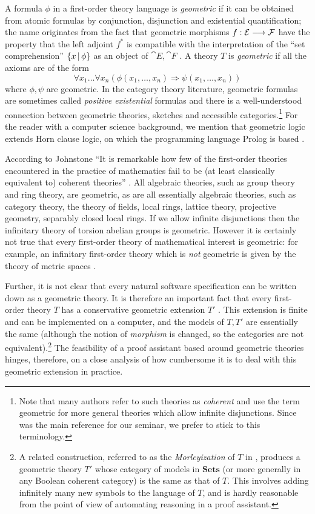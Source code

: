 \documentclass[english,letter paper,12pt,reqno]{article}
\theoremstyle{example}
\begin{document}
A formula $\phi$ in a first-order theory language is \emph{geometric} if it can be obtained from atomic formulas by conjunction, disjunction and existential quantification; the name originates from the fact that geometric morphisms $f: \mathcal{E} \longrightarrow \mathcal{F}$ have the property that the left adjoint $f^*$ is compatible with the interpretation of the ``set comprehension'' $\{ x \,|\, \phi \}$ as an object of $\cat{E}, \cat{F}$ \cite[Theorem X.5]{topos}. A theory $T$ is \emph{geometric} if all the axioms are of the form
\[
\forall x_1 \ldots \forall x_n ( \phi(x_1,\ldots,x_n) \Longrightarrow \psi(x_1,\ldots,x_n) )
\]
where $\phi, \psi$ are geometric. In the category theory literature, geometric formulas are sometimes called \emph{positive existential} formulas \cite[p.45]{makkai} and there is a well-understood connection between geometric theories, sketches and accessible categories.\footnote{Note that many authors refer to such theories as \emph{coherent} and use the term geometric for more general theories which allow infinite disjunctions. Since \cite{topos} was the main reference for our seminar, we prefer to stick to this terminology.} For the reader with a computer science background, we mention that geometric logic extends Horn clause logic, on which the programming language Prolog is based \cite{bezem2}.

According to Johnstone ``It is remarkable how few of the first-order theories encountered in the practice of mathematics fail to be (at least classically equivalent to) coherent theories'' \cite[\S D.1.1]{johnstone}. All algebraic theories, such as group theory and ring theory, are geometric, as are all essentially algebraic theories, such as category theory, the theory of fields, local rings, lattice theory, projective geometry, separably closed local rings. If we allow infinite disjunctions then the infinitary theory of torsion abelian groups is geometric. However it is certainly not true that every first-order theory of mathematical interest is geometric: for example, an infinitary first-order theory which is \emph{not} geometric is given by the theory of metric spaces \cite[Example 1.1.7(l)]{johnstone}.

Further, it is not clear that every natural software specification can be written down as a geometric theory. It is therefore an important fact that every first-order theory $T$ has a conservative geometric extension $T'$ \cite[Theorem 7.7]{negri}. This extension is finite and can be implemented on a computer, and the models of $T,T'$ are essentially the same (although the notion of \emph{morphism} is changed, so the categories are not equivalent).\footnote{A related construction, referred to as the \emph{Morleyization} of $T$ in \cite[D1.5.13]{johnstone}, produces a geometric theory $T'$ whose category of models in $\textbf{Sets}$ (or more generally in any Boolean coherent category) is the same as that of $T$. This involves adding infinitely many new symbols to the language of $T$, and is hardly reasonable from the point of view of automating reasoning in a proof assistant.} The feasibility of a proof assistant based around geometric theories hinges, therefore, on a close analysis of how cumbersome it is to deal with this geometric extension in practice.
\end{document}
